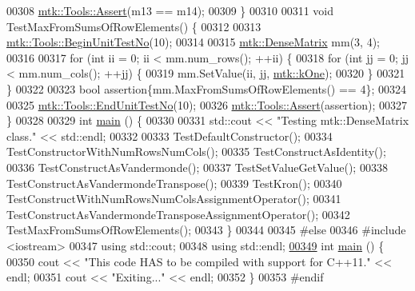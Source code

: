 \begin{DoxyCode}
00308   \hyperlink{classmtk_1_1Tools_ac6804df469c94ab6a796fb64f1e44a89}{mtk::Tools::Assert}(m13 == m14);
00309 \}
00310 
00311 \textcolor{keywordtype}{void} TestMaxFromSumsOfRowElements() \{
00312 
00313   \hyperlink{classmtk_1_1Tools_afc29ecaf337a13ed2e817d3890a5a441}{mtk::Tools::BeginUnitTestNo}(10);
00314 
00315   \hyperlink{classmtk_1_1DenseMatrix}{mtk::DenseMatrix} mm(3, 4);
00316 
00317   \textcolor{keywordflow}{for} (\textcolor{keywordtype}{int} ii = 0; ii < mm.num\_rows(); ++ii) \{
00318     \textcolor{keywordflow}{for} (\textcolor{keywordtype}{int} jj = 0; jj < mm.num\_cols(); ++jj) \{
00319       mm.SetValue(ii, jj, \hyperlink{group__c01-roots_ga26407c24d43b6b95480943340d285c71}{mtk::kOne});
00320     \}
00321   \}
00322 
00323   \textcolor{keywordtype}{bool} assertion\{mm.MaxFromSumsOfRowElements() == 4\};
00324 
00325   \hyperlink{classmtk_1_1Tools_aba67d9dc35c9c1c49430fcc9ea035e03}{mtk::Tools::EndUnitTestNo}(10);
00326   \hyperlink{classmtk_1_1Tools_ac6804df469c94ab6a796fb64f1e44a89}{mtk::Tools::Assert}(assertion);
00327 \}
00328 
00329 \textcolor{keywordtype}{int} \hyperlink{mtk__dense__matrix__test_8cc_ae66f6b31b5ad750f1fe042a706a4e3d4}{main} () \{
00330 
00331   std::cout << \textcolor{stringliteral}{"Testing mtk::DenseMatrix class."} << std::endl;
00332 
00333   TestDefaultConstructor();
00334   TestConstructorWithNumRowsNumCols();
00335   TestConstructAsIdentity();
00336   TestConstructAsVandermonde();
00337   TestSetValueGetValue();
00338   TestConstructAsVandermondeTranspose();
00339   TestKron();
00340   TestConstructWithNumRowsNumColsAssignmentOperator();
00341   TestConstructAsVandermondeTransposeAssignmentOperator();
00342   TestMaxFromSumsOfRowElements();
00343 \}
00344 
00345 \textcolor{preprocessor}{#else}
00346 \textcolor{preprocessor}{#include <iostream>}
00347 \textcolor{keyword}{using} std::cout;
00348 \textcolor{keyword}{using} std::endl;
\hypertarget{mtk__dense__matrix__test_8cc_source_l00349}{}\hyperlink{mtk__dense__matrix__test_8cc_ae66f6b31b5ad750f1fe042a706a4e3d4}{00349} \textcolor{keywordtype}{int} \hyperlink{mtk__dense__matrix__test_8cc_ae66f6b31b5ad750f1fe042a706a4e3d4}{main} () \{
00350   cout << \textcolor{stringliteral}{"This code HAS to be compiled with support for C++11."} << endl;
00351   cout << \textcolor{stringliteral}{"Exiting..."} << endl;
00352 \}
00353 \textcolor{preprocessor}{#endif}
\end{DoxyCode}
